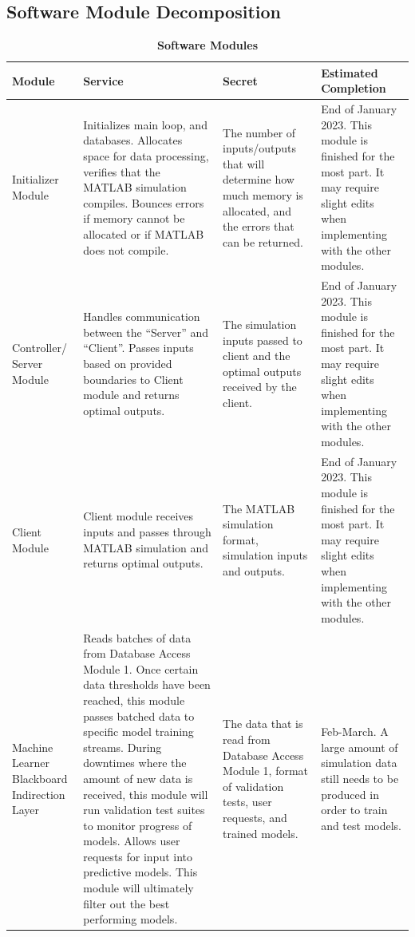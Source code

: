 \documentclass[12pt, titlepage]{article}
\begin{document}
\subsection{Software Module Decomposition}
\begin{longtable}{|p{2cm}|p{3cm}|p{3cm}|p{3cm}}
  \caption{\bf Software Modules}\\
    \hline
    \bf Module & \bf Service & \bf Secret & \bf Estimated Completion\\
    \hline
    Initializer Module & Initializes main loop, and databases.  Allocates space for data processing, verifies that the MATLAB simulation compiles. Bounces errors if memory cannot be allocated or if MATLAB does not compile.  & The number of inputs/outputs that will determine how much memory is allocated, and the errors that can be returned. & End of January 2023. This module is finished for the most part. It may require slight edits when implementing with the other modules.\\
    \hline 
    Controller/ Server Module & Handles communication between the “Server” and “Client”. Passes inputs based on provided boundaries to Client module and returns optimal outputs. & The simulation inputs passed to client and the optimal outputs received by the client. & End of January 2023. This module is finished for the most part. It may require slight edits when implementing with the other modules.\\
    \hline 
    Client Module & Client module receives inputs and passes through MATLAB simulation and returns optimal outputs. & The MATLAB simulation format, simulation inputs and outputs. & End of January 2023. This module is finished for the most part. It may require slight edits when implementing with the other modules.\\
    \hline 
    Machine Learner Blackboard Indirection Layer & Reads batches of data from Database Access Module 1. Once certain data thresholds have been reached, this module passes batched data to specific model training streams. During downtimes where the amount of new data is received, this module will run validation test suites to monitor progress of models. Allows user requests for input into predictive models. This module will ultimately filter out the best performing models. & The data that is read from Database Access Module 1, format of validation tests, user requests, and trained models. & Feb-March. A large amount of simulation data still needs to be produced in order to train and test models.\\

\end{longtable}
\end{document}
